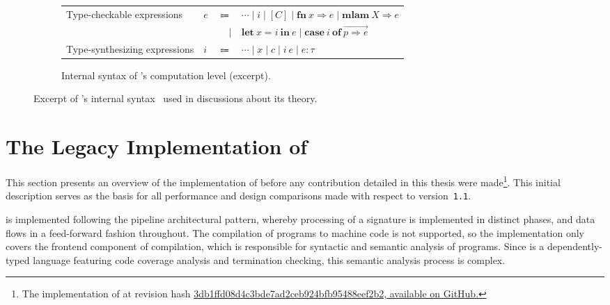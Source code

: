 \begin{figure}
\begin{subfigure}{\linewidth}
\begin{tabular}{p{5.5cm} >{\raggedleft}p{1cm} r l}
Type-checkable expressions & $e$ & $\Coloneqq$ & $\cdots \mid i \mid [C] \mid \mathbf{fn}\ x \Rightarrow e \mid \mathbf{mlam}\ X \Rightarrow e$ \\
& & $|$ & $\mathbf{let}\ x = i\ \mathbf{in}\ e \mid \mathbf{case}\ i\ \mathbf{of}\ \overrightarrow{p \Rightarrow e}$\\
Type-synthesizing expressions & $i$ & $\Coloneqq$ & $\cdots \mid x \mid c \mid i \ e \mid e : \tau$
\end{tabular}
\caption{Internal syntax of \Beluga's computation level (excerpt).}
\end{subfigure}
\caption[Excerpt of \Beluga's internal syntax]{%
Excerpt of \Beluga's internal syntax~\cite{nanevski2008contextual, germain2010implementation, cave2013first, ferreira2013compiling} used in discussions about its theory.
}
\label{figure:internal-syntax}
\end{figure}

\section{The Legacy Implementation of \Beluga} \label{section:beluga-implementation}

This section presents an overview of the implementation of \Beluga before any contribution detailed in this thesis were made\footnote{The implementation of \Beluga at revision hash \href{https://github.com/Beluga-lang/Beluga/tree/3db1ffd08d4c3bde7ad2ceb924bfb95488eef2b2}{3db1ffd08d4c3bde7ad2ceb924bfb95488eef2b2, available on GitHub.}}.
This initial description serves as the basis for all performance and design comparisons made with respect to \Beluga version~\texttt{1.1}.

\Beluga is implemented following the pipeline architectural pattern, whereby processing of a signature is implemented in distinct phases, and data flows in a feed-forward fashion throughout.
The compilation of \Beluga programs to machine code is not supported, so the implementation only covers the frontend component of compilation, which is responsible for syntactic and semantic analysis of programs.
Since \Beluga is a dependently-typed language featuring code coverage analysis and termination checking, this semantic analysis process is complex.

